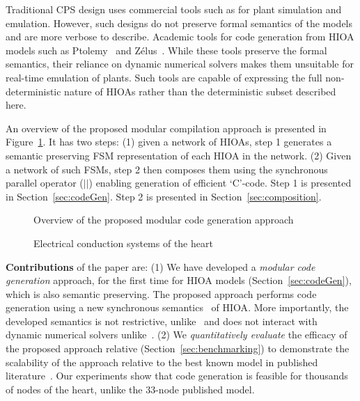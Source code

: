 {  Traditional \ac{CPS} design uses commercial tools such as \simulink
  for plant simulation and emulation. However, such designs do not
  preserve formal semantics of the models and are more verbose to
  describe. Academic tools for code generation from \ac{HIOA} models
  such as Ptolemy~\cite{ptolemaeus2014system} and
  Z\'{e}lus~\cite{bourke13zelus}. While these tools preserve the formal
  semantics, their reliance on dynamic numerical solvers makes them
  unsuitable for real-time emulation of plants. Such tools are capable
  of expressing the full non-deterministic nature of \acp{HIOA} rather
  than the deterministic subset described here.}

An overview of the proposed modular compilation approach is presented in
Figure~\ref{fig:overview}. It has two steps: (1) given a network of
\acp{HIOA}, step 1 generates a semantic preserving \ac{FSM}
representation of each \ac{HIOA} in the network. (2) Given a network of
such \acp{FSM}, step 2 then composes them using the synchronous parallel
operator ($||$) enabling generation of efficient `C'-code. Step 1 is
presented in Section~\ref{sec:codeGen}. Step 2 is presented in
Section~\ref{sec:composition}.


\begin{figure}[bthp]
  \centering \scalebox{0.7}{  }
  \caption{Overview of the proposed modular code generation
    approach \label{fig:overview}}
\end{figure}

\begin{figure*}[hbpt]
  \centering 
  \caption{Electrical conduction systems of the heart}
  \label{fig:heartOverview}
\end{figure*}

\textbf{Contributions} of the paper are:  %
  (1) We have
developed a \emph{modular code generation} approach, for the first time
for \ac{HIOA} models (Section~\ref{sec:codeGen}), which is also semantic
preserving. The proposed approach performs code generation using a new
synchronous semantics~\cite{benveniste03} of \ac{HIOA}. More
importantly, the developed semantics is not restrictive,
unlike~\cite{alur2003generating, kim2003modular} and does not interact
with dynamic numerical solvers unlike~\cite{ptolemaeus2014system,
  bourke13zelus}. (2) We \emph{quantitatively evaluate} the efficacy of
the proposed approach relative \simulink
(Section~\ref{sec:benchmarking}) to demonstrate the scalability of the
approach relative to the best known model in published
literature~\cite{chen14}. Our experiments show that code generation is
feasible for thousands of nodes of the heart, unlike the 33-node
published model. %




